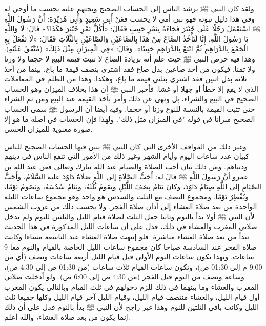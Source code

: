 ولقد كان النبي ﷺ يرشد الناس إلى الحساب الصحيح ويحثهم عليه بحسب ما أوحي له وفي هذا دليل نبوته فهو نبي أمي لا يحسب فعَنْ أَبِي سَعِيدٍ وَأَبِي هُرَيْرَةَ: أَنَّ رَسُولَ اللَّهِ ﷺ اسْتَعْمَلَ رَجُلًا عَلَى خَيْبَرَ فَجَاءَهُ بِتَمْرٍ جَنِيبٍ فَقَالَ: «أَكُلُّ تَمْرِ خَيْبَرَ هَكَذَا؟» قَالَ: لَا وَاللَّهِ يَا رَسُولَ اللَّهِ, إِنَّا لَنَأْخُذُ الصَّاعَ مِنْ هَذَا بِالصَّاعَيْنِ وَالصَّاعَيْنِ بِالثَّلَاثِ فَقَالَ: «لَا تَفْعَلْ بِعِ الْجَمْعَ بِالدَّرَاهِمِ ثُمَّ ابْتَعْ بِالدَّرَاهِمِ جَنِيبًا». وَقَالَ: «فِي الْمِيزَانِ مِثْلَ ذَلِكَ» {\footnotesize (مُتَّفَقٌ عَلَيْهِ)}.
وهذا فيه حرص النبي ﷺ حيث علم أنه بزيادة الصاع لا تثبت قيمة البيع لا حجما ولا وزنا ولا ثمنا. فيكون من أخذ صاعين بدل صاع فقد اشترى بنصف قيمة ما باع، بينما من أخذ ثلاثة بدل اثنين فقد اشترى بثلثي قيمة ما باع، وهكذا. وهذا من الظلم في المعاملات الذي لا يقع إلا خطأ أو جهلا أو غشا. فأخبر النبي ﷺ أن هذا بخلاف الميزان وهو الحساب الصحيح في البيع والشراء، بل ونهى عن ذلك وأمر بأخذ القيمة عند البيع ومن ثم الشراء حتى تثبت القيمة بالنسبة للنوع وزنا أو حجما. وفيه أيضا أن الرسول ﷺ سمى الحساب الصحيح ميزانا في قوله "في الميزان مثل ذلك". ولهذا فإن الحساب في أصله ما هو إلا صورة معنوية للميزان الحسي.

وغير ذلك من المواقف الأخرى التي كان النبي ﷺ يبين فيها الحساب الصحيح للناس كبيان عدد ساعات اليوم وأيام الشهر وغير ذلك من الأمور التي تنفع الناس في دينهم ودنياهم. ومن ذلك بيان أحب الصلاة والصيام عند الله تبارك وتعالى فعن عبد الله بن عمرو أنَّ رَسولَ اللَّهِ ﷺ قالَ له: أَحَبُّ الصَّلَاةِ إلى اللَّهِ صَلَاةُ دَاوُدَ عليه السَّلَامُ، وأَحَبُّ الصِّيَامِ إلى اللَّهِ صِيَامُ دَاوُدَ، وكانَ يَنَامُ نِصْفَ اللَّيْلِ ويقومُ ثُلُثَهُ، ويَنَامُ سُدُسَهُ، ويَصُومُ يَوْمًا، ويُفْطِرُ يَوْمًا. ومجموع النصف مع الثلث والسدس هو واحد وهو مجموع ساعات الليلة الواحدة من بعد صلاة العشاء إلى أذان صلاة الفجر. ولا يحسب ذلك من غروب الشمس لأن النبي ﷺ أولا بدأ بالنوم وثانيا جعل الثلث لصلاة قيام الليل والثلثين للنوم ولم يدخل صلاتي المغرب والعشاء في ذلك، فدل على أن ساعات الليل المذكورة في هذا الحديث تبدأ من بعد صلاة العشاء مباشرة. فلو إنتهت صلاة العشاء عند التاسعة مساءا وكانت صلاة الفجر عند السادسة صباحا كان مجموع ساعات الليل الخاصة بالقيام والنوم معا 9 ساعات. وبهذا تكون ساعات النوم الأولى قبل قيام الليل أربعة ساعات ونصف (أي من 9:00 م إلى 01:30 ص)، وتكون ساعات القيام ثلاث ساعات (من 01:30 ص إلى 4:30 ص)، وساعة ونصف من النوم قبل الفجر (من 4:30 ص إلى 6:00 ص). ولو أدخلت صلاتي المغرب والعشاء وما بينهما في ذلك للزم دخولهم في ثلث القيام وبالتالي يكون المغرب أول قيام الليل، والعشاء منتصف قيام الليل، وقيام الليل آخر قيام الليل وكلها جميعا ثلث الليل وكانت باقي الثلثين للنوم وهذا غير راجح لأن النبي ﷺ بدأ بالنوم فدل على أن ذلك إنما يكون من بعد صلاة العشاء، والله أعلم.


